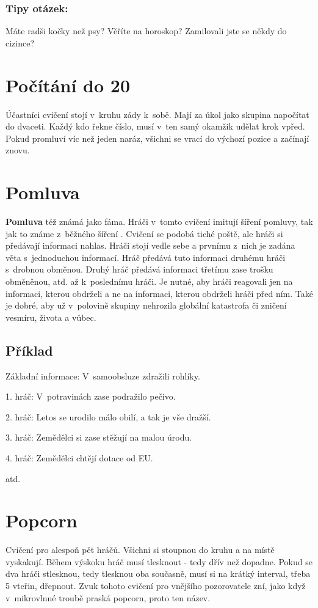 \subsubsection{Tipy otázek:} Máte radši kočky než psy? 
Věříte na horoskop? 
Zamilovali jste se někdy do cizince? 
 
 
 
 
\needspace{5cm} \section{Počítání do 20} \label{počítání do 20} Účastníci cvičení stojí v kruhu zády k sobě. Mají za úkol jako skupina napočítat do dvaceti. Každý kdo řekne číslo, musí v~ten samý okamžik udělat krok vpřed. Pokud 
promluví víc než jeden naráz, všichni se vrací do výchozí pozice a začínají znovu. 
 
 
 
 
\needspace{5cm} \section{Pomluva} \label{pomluva} \textbf{Pomluva} též známá jako fáma. Hráči v~tomto cvičení imitují šíření pomluvy, tak jak to známe z~běžného šíření  . Cvičení se podobá tiché poště, ale hráči si předávají informaci nahlas. Hráči stojí vedle sebe a prvnímu z~nich je zadána věta s~jednoduchou informací. Hráč předává tuto informaci druhému hráči s~drobnou obměnou. Druhý hráč předává informaci třetímu zase trošku obměněnou, atd. až k~poslednímu hráči. Je nutné, aby hráči reagovali jen na informaci, kterou obdrželi a ne na informaci, kterou obdrželi hráči před ním. Také je dobré, aby už v~polovině skupiny nehrozila globální katastrofa či zničení vesmíru, života a vůbec. 
 
 
\subsection{Příklad}  
Základní informace: V~samoobsluze zdražili rohlíky. 
 
1. hráč: V~potravinách zase podražilo pečivo. 
 
2. hráč: Letos se urodilo málo obilí, a tak je vše dražší. 
 
3. hráč: Zemědělci si zase stěžují na malou úrodu. 
 
4. hráč: Zemědělci chtějí dotace od EU. 
 
atd. 
 
 
 
\needspace{5cm} \section{Popcorn} \label{popcorn} Cvičení pro alespoň pět hráčů. Všichni si stoupnou do kruhu a na místě vyskakují. Během výskoku hráč musí tlesknout - tedy dřív než dopadne. Pokud se dva hráči stlesknou, tedy tlesknou oba současně, musí si na krátký interval, třeba 5 vteřin, dřepnout. Zvuk tohoto cvičení pro vnějšího pozorovatele zní, jako když v~mikrovlnné troubě praská popcorn, proto ten název. 
 
